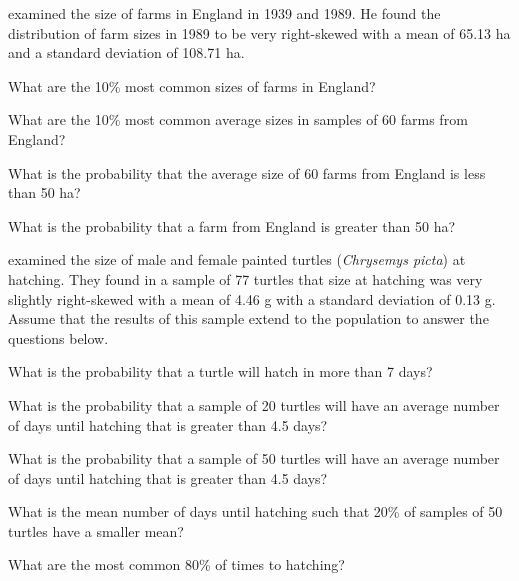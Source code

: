 \documentclass[10pt,openany]{book}\usepackage[]{graphicx}\usepackage[]{color}
\begin{document}
\begin{exsection}
  \begin{minipage}{\textwidth}
  \item \label{revex:CLTFarms} \rhw{} \cite{Allanson1992} examined the size of farms in England in 1939 and 1989. He found the distribution of farm sizes in 1989 to be very right-skewed with a mean of 65.13 ha and a standard deviation of 108.71 ha.
    \begin{Enumerate}
      \item What are the 10\% most common sizes of farms in England?
      \item What are the 10\% most common average sizes in samples of 60 farms from England?
      \item What is the probability that the average size of 60 farms from England is less than 50 ha?
      \item What is the probability that a farm from England is greater than 50 ha?
    \end{Enumerate}
  \end{minipage}
  \item \label{revex:CLTTurtles} \rhw{} \cite{JanzenMorjan2002} examined the size of male and female painted turtles (\textit{Chrysemys picta}) at hatching. They found in a sample of 77 turtles that size at hatching was very slightly right-skewed with a mean of 4.46 g with a standard deviation of 0.13 g. Assume that the results of this sample extend to the population to answer the questions below.
    \begin{Enumerate}
      \item What is the probability that a turtle will hatch in more than 7 days?
      \item What is the probability that a sample of 20 turtles will have an average number of days until hatching that is greater than 4.5 days?
      \item What is the probability that a sample of 50 turtles will have an average number of days until hatching that is greater than 4.5 days?
      \item What is the mean number of days until hatching such that 20\% of samples of 50 turtles have a smaller mean?
      \item What are the most common 80\% of times to hatching?
    \end{Enumerate}


\end{exsection}
\end{document}
